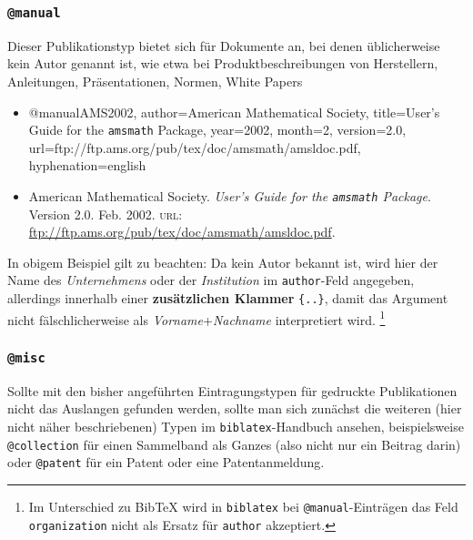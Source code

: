 \subsubsection{\texttt{@manual}}
\label{sec:@manual}
Dieser Publikationstyp bietet sich für Dokumente an, bei denen üblicherweise kein Autor genannt ist, wie etwa bei Produktbeschreibungen von Herstellern, Anleitungen, Präsentationen, Normen, White Papers \usw
%
\begin{itemize}
\item[]
\begin{GenericCode}[numbers=none]
@manual{AMS2002,
	author={{American Mathematical Society}},
	title={User's Guide for the \texttt{amsmath} Package},
	year={2002},
	month={2},
	version={2.0},
	url={ftp://ftp.ams.org/pub/tex/doc/amsmath/amsldoc.pdf},
	hyphenation={english}
}
\end{GenericCode}
\item[\cite{AMS2002}]
American Mathematical Society. 
\textit{User's Guide for the \texttt{amsmath} Package}. 
Version 2.0. Feb. 2002. \textsc{url}: \url{ftp://ftp.ams.org/pub/tex/doc/amsmath/amsldoc.pdf}.
\end{itemize}
%
In obigem Beispiel gilt zu beachten: 
Da kein Autor bekannt ist, wird hier der Name des \emph{Unternehmens} oder der \emph{Institution} im \texttt{author}-Feld angegeben, allerdings innerhalb einer \textbf{zusätzlichen Klammer} \texttt{\{..\}}, damit das Argument nicht fälschlicherweise als \emph{Vorname}+\emph{Nachname} interpretiert wird.%
\footnote{Im Unterschied zu BibTeX wird in \texttt{biblatex} bei \texttt{@manual}-Einträgen das Feld \texttt{organization} nicht als Ersatz für \texttt{author} akzeptiert.}


\subsubsection{\texttt{@misc}}
\label{sec:@misc}
Sollte mit den bisher angeführten Eintragungstypen für gedruckte Publikationen
nicht das Auslangen gefunden werden, sollte man sich zunächst die weiteren (hier nicht näher beschriebenen) 
Typen im \texttt{biblatex}-Handbuch \cite{Lehman2015} ansehen, beispielsweise
\texttt{@collection} für einen Sammelband als Ganzes (also nicht nur ein Beitrag darin)
oder \texttt{@patent} für ein Patent oder eine Patentanmeldung.

